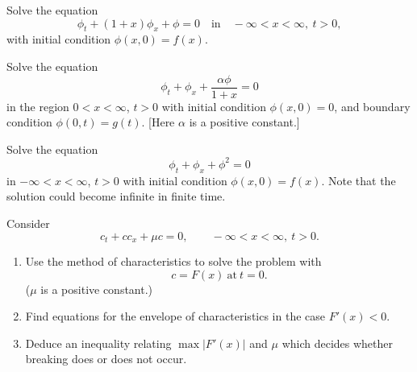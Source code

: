 \begin{Exercise}
  Solve the equation
  \[ 
  \phi_t + (1+x)\phi_x + \phi = 0 \quad \mathrm{in} \quad 
  -\infty < x < \infty,\ t > 0, 
  \]
  with initial condition $\phi(x,0) = f(x)$.
\end{Exercise}



\begin{Exercise}
  Solve the equation
  \[ 
  \phi_t + \phi_x + \frac{\alpha \phi}{1+x} = 0 
  \]
  in the region $0 < x < \infty$, $t > 0$ with initial condition $\phi(x,0)=0$,
  and boundary condition $\phi(0,t) = g(t)$. [Here $\alpha$ is a positive
  constant.]
\end{Exercise}



\begin{Exercise}
  Solve the equation
  \[ 
  \phi_t + \phi_x +\phi^2 = 0 
  \]
  in $-\infty < x < \infty$, $t > 0$ with initial condition $\phi(x,0)=f(x)$.
  Note that the solution could become infinite in finite time.
\end{Exercise}



\begin{Exercise}
  Consider
  \[ 
  c_t + c c_x + \mu c = 0, \qquad -\infty < x < \infty,\ t > 0.
  \]
  \begin{enumerate}
  \item
    Use the method of characteristics to solve the problem with
    \[ 
    c = F(x)\ \mathrm{at}\ t = 0. 
    \]
    ($\mu$ is a positive constant.)
  \item
    Find equations for the envelope of characteristics in the case $F'(x)<0$.
  \item
    Deduce an inequality relating $\max |F'(x)|$ and $\mu$ which decides
    whether breaking does or does not occur.
  \end{enumerate}
\end{Exercise}



